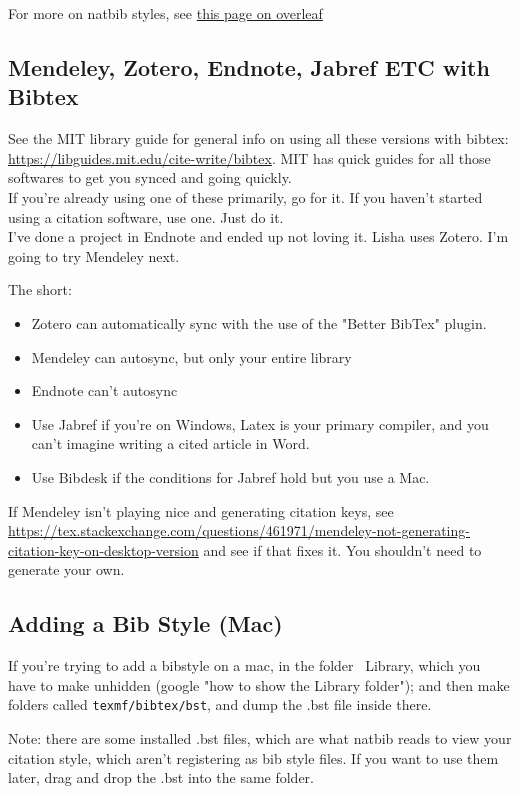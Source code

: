 For more on natbib styles, see \href{https://www.overleaf.com/learn/latex/Natbib_bibliography_styles}{this page on overleaf}

\subsection{Mendeley, Zotero, Endnote, Jabref ETC with Bibtex}
See the MIT library guide for general info on using all these versions with bibtex: \url{https://libguides.mit.edu/cite-write/bibtex}. MIT has quick guides for all those softwares to get you synced and going quickly.\\

If you're already using one of these primarily, go for it. If you haven't started using a citation software, use one. Just do it.\\

I've done a project in Endnote and ended up not loving it. Lisha uses Zotero. I'm going to try Mendeley next.

The short:\\
\begin{itemize}
\item Zotero can automatically sync with the use of the "Better BibTex" plugin.
\item Mendeley can autosync, but only your entire library
\item Endnote can't autosync
\item Use Jabref if you're on Windows, Latex is your primary compiler, and you can't imagine writing a cited article in Word.
\item Use Bibdesk if the conditions for Jabref hold but you use a Mac.
\end{itemize}

If Mendeley isn't playing nice and generating citation keys, see \url{https://tex.stackexchange.com/questions/461971/mendeley-not-generating-citation-key-on-desktop-version} and see if that fixes it. You shouldn't need to generate your own.

\subsection{Adding a Bib Style (Mac)}
If you're trying to add  a bibstyle on a mac, in the folder ~Library, which you have to make unhidden (google "how to show the Library folder"); and then make folders called \verb+texmf/bibtex/bst+, and dump the .bst file inside there.

Note: there are some installed .bst files, which are what natbib reads to view your citation style, which aren't registering as bib style files. If you want to use them later, drag and drop the .bst into the same folder. 


